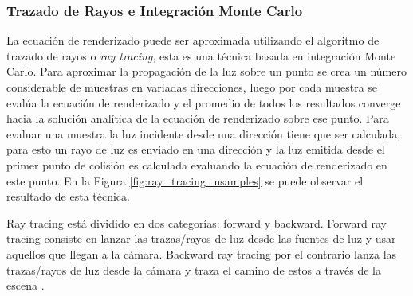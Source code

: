 \subsubsection{Trazado de Rayos e Integración Monte Carlo}
\label{subsec:monte_carlo_raytracing}
La ecuación de renderizado puede ser aproximada utilizando el algoritmo de trazado de rayos o \emph{ray tracing}, esta es una técnica basada en integración Monte Carlo. Para aproximar la propagación de la luz sobre un punto se crea un número considerable de muestras en variadas direcciones, luego por cada muestra se evalúa la ecuación de renderizado y el promedio de todos los resultados converge hacia la solución analítica de la ecuación de renderizado sobre ese punto. Para evaluar una muestra la luz incidente desde una dirección tiene que ser calculada, para esto un rayo de luz es enviado en una dirección y la luz emitida desde el primer punto de colisión es calculada evaluando la ecuación de renderizado en este punto. En la Figura \ref{fig:ray_tracing_nsamples} se puede observar el resultado de esta técnica.

Ray tracing está dividido en dos categorías: forward y backward. Forward ray tracing consiste en lanzar las trazas/rayos de luz desde las fuentes de luz y usar aquellos que llegan a la cámara. Backward ray tracing por el contrario lanza las trazas/rayos de luz desde la cámara y traza el camino de estos a través de la escena \cite{Arvo86backwardray}.

